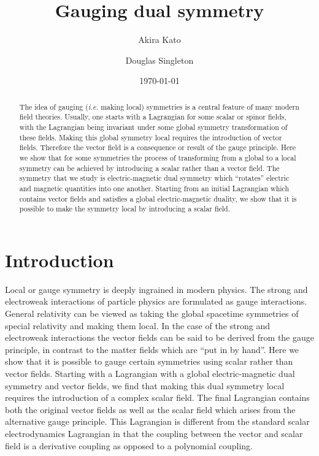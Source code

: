 \documentclass[a4paper,aps]{revtex4}
\begin{document}
\title{Gauging dual symmetry}
\author{Akira Kato}
\author{Douglas Singleton}

\date{\today}

\begin{abstract}
The idea of gauging ({\it i.e.} making local) symmetries
is a central feature of many modern
field theories. Usually, one starts with a Lagrangian for
some scalar or spinor fields, with the Lagrangian being
invariant under some global symmetry transformation of these
fields. Making this global symmetry local requires
the introduction of vector fields. Therefore the
vector field is a consequence or result of the gauge
principle. Here we show that for some symmetries the process
of transforming from a global to a local symmetry can be
achieved by introducing a scalar rather than a vector field.
The symmetry that we study is electric-magnetic dual
symmetry which ``rotates'' electric and magnetic quantities into
one another. Starting from an initial Lagrangian which contains
vector fields and satisfies a global electric-magnetic duality,
we show that it is possible to make the symmetry local by
introducing a scalar field.
\end{abstract}


\maketitle

\section{Introduction}
Local or gauge symmetry is deeply ingrained in
modern physics. The strong and electroweak interactions of
particle physics are formulated as gauge interactions. General
relativity can be viewed as taking the global spacetime symmetries
of special relativity and making them local. In the case
of the strong and electroweak interactions the vector fields
can be said to be derived from the gauge principle, in
contrast to the matter fields which are ``put in by hand''.
Here we show that it is possible to gauge certain symmetries
using scalar rather than vector fields. Starting with a
Lagrangian with a global electric-magnetic
dual symmetry and vector fields, we find that
making this dual symmetry local requires the introduction of a
complex scalar field. The final Lagrangian contains both the
original vector fields as well as the scalar field which arises
from the alternative gauge principle. This Lagrangian is different
from the standard scalar electrodynamics Lagrangian in that
the coupling between the vector and scalar field is
a derivative coupling as opposed to a polynomial coupling.
\end{document}

